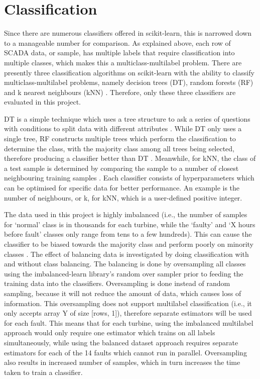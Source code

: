 \section{Classification}

Since there are numerous classifiers offered in scikit-learn, this is narrowed down to a manageable number for comparison. As explained above, each row of SCADA data, or sample, has multiple labels that require classification into multiple classes, which makes this a multiclass-multilabel problem. There are presently three classification algorithms on scikit-learn with the ability to classify multiclass-multilabel problems, namely decision trees (DT), random forests (RF) and k nearest neighbours (kNN) \cite{112}.
 Therefore, only these three classifiers are evaluated in this project.

DT is a simple technique which uses a tree structure to ask a series of questions with conditions to split data with different attributes \cite{Decis10}. While DT only uses a single tree, RF constructs multiple trees which perform the classification to determine the class, with the majority class among all trees being selected, therefore producing a classifier better than DT \cite{Rando}. Meanwhile, for kNN, the class of a test sample is determined by comparing the sample to a number of closest neighbouring training samples \cite{Sutto12,16N}. Each classifier consists of hyperparameters which can be optimised for specific data for better performance. An example is the number of neighbours, or k, for kNN, which is a user-defined positive integer.

The data used in this project is highly imbalanced (i.e., the number of samples for `normal' class is in thousands for each turbine, while the `faulty' and `X hours before fault' classes only range from tens to a few hundreds). This can cause the classifier to be biased towards the majority class and perform poorly on minority classes \cite{110}. The effect of balancing data is investigated by doing classification with and without class balancing. The balancing is done by oversampling all classes using the imbalanced-learn library's random over sampler \cite{Lemai} prior to feeding the training data into the classifiers. Oversampling is done instead of random sampling, because it will not reduce the amount of data, which causes loss of information. This oversampling does not support multilabel classification (i.e., it only accepts array Y of size [rows, 1]), therefore separate estimators will be used for each fault. This means that for each turbine, using the imbalanced multilabel approach would only require one estimator which trains on all labels simultaneously, while using the balanced dataset approach requires separate estimators for each of the 14 faults which cannot run in parallel. Oversampling also results in increased number of samples, which in turn increases the time taken to train a classifier.

